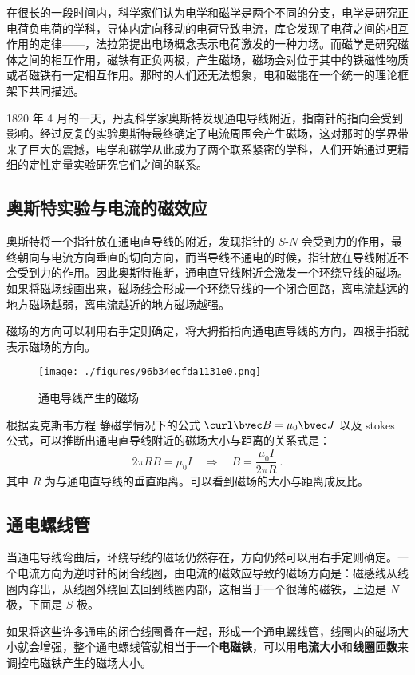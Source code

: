 

在很长的一段时间内，科学家们认为电学和磁学是两个不同的分支，电学是研究正电荷负电荷的学科，导体内定向移动的电荷导致电流，库仑发现了电荷之间的相互作用的定律——，法拉第提出电场概念表示电荷激发的一种力场。而磁学是研究磁体之间的相互作用，磁铁有正负两极，产生磁场，磁场会对位于其中的铁磁性物质或者磁铁有一定相互作用。那时的人们还无法想象，电和磁能在一个统一的理论框架下共同描述。

1820 年 4 月的一天，丹麦科学家奥斯特发现通电导线附近，指南针的指向会受到影响。经过反复的实验奥斯特最终确定了电流周围会产生磁场，这对那时的学界带来了巨大的震撼，电学和磁学从此成为了两个联系紧密的学科，人们开始通过更精细的定性定量实验研究它们之间的联系。
\subsection{奥斯特实验与电流的磁效应}
奥斯特将一个指针放在通电直导线的附近，发现指针的 $S$-$N$ 会受到力的作用，最终朝向与电流方向垂直的切向方向，而当导线不通电的时候，指针放在导线附近不会受到力的作用。因此奥斯特推断，通电直导线附近会激发一个环绕导线的磁场。如果将磁场线画出来，磁场线会形成一个环绕导线的一个闭合回路，离电流越远的地方磁场越弱，离电流越近的地方磁场越强。

磁场的方向可以利用右手定则确定，将大拇指指向通电直导线的方向，四根手指就表示磁场的方向。

\begin{figure}[ht]
\centering
\texttt{[image: ./figures/96b34ecfda1131e0.png]}
\caption{通电导线产生的磁场} \label{fig_CurMag_1}
\end{figure}

根据麦克斯韦方程 静磁学情况下的公式 $\curl \bvec B=\mu_0 \bvec J$ 以及 stokes 公式，可以推断出通电直导线附近的磁场大小与距离的关系式是：
\begin{equation}
2\pi R B = \mu_0 I\quad \Rightarrow\quad B=\frac{\mu_0 I }{2\pi R}~.
\end{equation}
其中 $R$ 为与通电直导线的垂直距离。可以看到磁场的大小与距离成反比。
\subsection{通电螺线管}
当通电导线弯曲后，环绕导线的磁场仍然存在，方向仍然可以用右手定则确定。一个电流方向为逆时针的闭合线圈，由电流的磁效应导致的磁场方向是：磁感线从线圈内穿出，从线圈外绕回去回到线圈内部，这相当于一个很薄的磁铁，上边是 $N$ 极，下面是 $S$ 极。

如果将这些许多通电的闭合线圈叠在一起，形成一个通电螺线管，线圈内的磁场大小就会增强，整个通电螺线管就相当于一个\textbf{电磁铁}，可以用\textbf{电流大小}和\textbf{线圈匝数}来调控电磁铁产生的磁场大小。